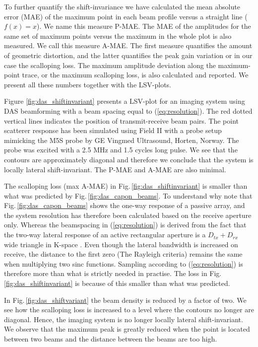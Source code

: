\documentclass[journal]{IEEEtran}
\begin{document}
To further quantify the shift-invariance we have calculated the mean absolute error (MAE) of the maximum point in each beam profile versus a straight line ($f(x)=x$). We name this measure P-MAE. The MAE of the amplitudes for the same set of maximum points versus the maximum in the whole plot is also measured. We call this measure A-MAE. The first measure quantifies the amount of geometric distortion, and the latter quantifies the peak gain variation or in our case the scalloping loss. The maximum amplitude deviation along the maximum-point trace, or the maximum scalloping loss, is also calculated and reported. We present all these numbers together with the LSV-plots.

Figure \ref{fig:das_shiftinvariant} presents a LSV-plot for an imaging system using DAS beamforming with a beam spacing equal to (\ref{eq:resolution}). The red dotted vertical lines indicates the position of transmit-receive beam pairs. The point scatterer response has been simulated using Field II \cite{Jensen1992, Jensen1996a} with a probe setup mimicking the M5S probe by GE Vingmed Ultrasound, Horten, Norway. The probe was excited with a 2.5 MHz and 1.5 cycles long pulse. We see that the contours are approximately diagonal and therefore we conclude that the system is locally lateral shift-invariant. The P-MAE and A-MAE are also minimal. 

The scalloping loss (max A-MAE) in Fig.\,\ref{fig:das_shiftinvariant} is smaller than what was predicted by Fig.\,\ref{fig:das_capon_beams}. To understand why note that Fig.\,\ref{fig:das_capon_beams} shows the one-way response of a passive array, and the system resolution has therefore been calculated based on the receive aperture only. Whereas the beamspacing in (\ref{eq:resolution}) is derived from the fact that the two-way lateral response of an active rectangular aperture is a $D_{tx}+D_{rx}$ wide triangle in K-space \cite{Hergum2009}. Even though the lateral bandwidth is increased on receive, the distance to the first zero (The Rayleigh criteria) remains the same when multiplying two sinc functions. Sampling according to (\ref{eq:resolution}) is therefore more than what is strictly needed in practise. The loss in Fig.\,\ref{fig:das_shiftinvariant} is because of this smaller than what was predicted.

In Fig.\,\ref{fig:das_shiftvariant} the beam density is reduced by a factor of two. We see how the scalloping loss is increased to a level where the contours no longer are diagonal. Hence, the imaging system is no longer locally lateral shift-invariant. We observe that the maximum peak is greatly reduced when the point is located between two beams and the distance between the beams are too high.
\end{document}
